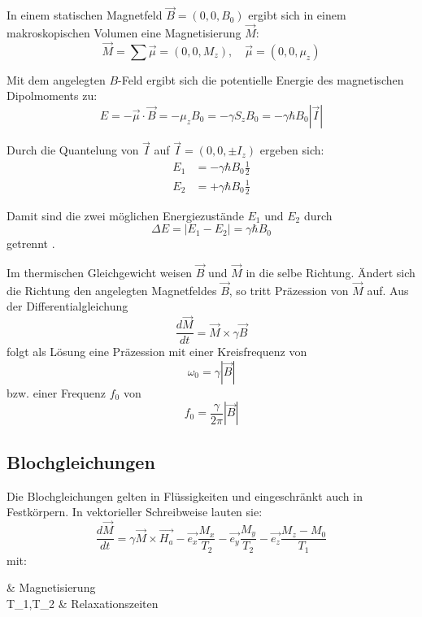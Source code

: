 In einem statischen Magnetfeld $\vec{B}=(0,0,B_0)$ ergibt sich in einem makroskopischen Volumen eine Magnetisierung $\vec{M}$:
\begin{equation}
	\vec{M} = \sum \vec{\mu} = (0,0,M_z), \quad \vec{\mu}=(0,0,\mu_z)
\end{equation}

Mit dem angelegten $B$-Feld ergibt sich die potentielle Energie des magnetischen Dipolmoments zu:
\begin{equation}
	E=-\vec{\mu} \cdot \vec{B} = -\mu_z B_0 = -\gamma S_z B_0 = -\gamma \hbar B_0 |\vec{I}|
\end{equation}

Durch die Quantelung von $\vec{I}$ auf $\vec{I}=(0,0,\pm I_z)$ ergeben sich:
\begin{subequations}
	\begin{align}
	E_1 & = -\gamma \hbar B_0 \frac{1}{2} \\
	E_2 & = +\gamma \hbar B_0 \frac{1}{2}
	\end{align}
\end{subequations}

Damit sind die zwei möglichen Energiezustände $E_1$ und $E_2$ durch
\begin{equation}
	\Delta E = |E_1 - E_2| = \gamma \hbar B_0
\end{equation}
getrennt \cite[S.~ 56]{Nishimura1996}.

Im thermischen Gleichgewicht weisen $\vec{B}$ und $\vec{M}$ in die selbe Richtung. Ändert sich die Richtung den angelegten Magnetfeldes $\vec{B}$, so tritt Präzession von $\vec{M}$ auf. Aus der Differentialgleichung
\begin{equation}
	\frac{d\vec{M}}{dt}=\vec{M} \times \gamma \vec{B}
\end{equation}
folgt als Lösung eine Präzession mit einer Kreisfrequenz von
\begin{equation}
	\omega_0=\gamma |\vec{B}|
\end{equation}
bzw. einer Frequenz $f_0$ von
\begin{equation}
	f_0=\frac{\gamma}{2\pi} |\vec{B}|
\end{equation}


\subsection{Blochgleichungen}
Die Blochgleichungen gelten in Flüssigkeiten und eingeschränkt auch in Festkörpern. In vektorieller Schreibweise lauten sie:
\begin{equation}
	\frac{d\vec{M}}{dt}=\gamma\vec{M}\times\vec{H_a}-\vec{e_x}\frac{M_x}{T_2}-\vec{e_y}\frac{M_y}{T_2}-\vec{e_z}\frac{M_z-M_0}{T_1}
\end{equation}
mit:
\begin{with*}
	 & Magnetisierung \\
	T_1,T_2 & Relaxationszeiten \\
\end{with*}

